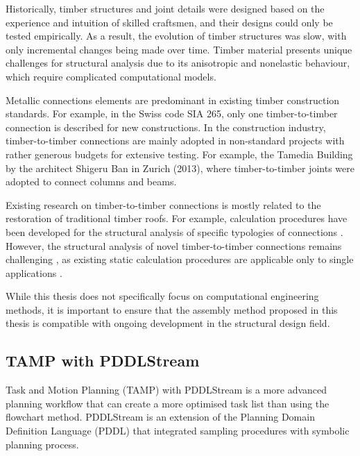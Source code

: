 Historically, timber structures and joint details were designed based on the experience and intuition of skilled craftsmen, and their designs could only be tested empirically. As a result, the evolution of timber structures was slow, with only incremental changes being made over time. Timber material presents unique challenges for structural analysis due to its anisotropic and nonelastic behaviour, which require complicated computational models. 

Metallic connections elements are predominant in existing timber construction standards. For example, in the Swiss code SIA 265, only one timber-to-timber connection is described for new constructions. In the construction industry, timber-to-timber connections are mainly adopted in non-standard projects with rather generous budgets for extensive testing. For example, the Tamedia Building by the architect Shigeru Ban in Zurich (2013), where timber-to-timber joints were adopted to connect columns and beams. \parencite{tanadiniAnalysisDesignTimbertotimber2021}

Existing research on timber-to-timber connections is mostly related to the restoration of traditional timber roofs. For example, calculation procedures have been developed for the structural analysis of specific typologies of connections \parencite{holzerstefanm.StaticAssessmentHistorical2015}. However, the structural analysis of novel timber-to-timber connections remains challenging \parencite{tanadiniAnalysisDesignTimbertotimber2021}, as existing static calculation procedures are applicable only to single applications \parencite{fangJoineryConnectionsTimber2018, nguyenDevelopmentSpringModel2018, rezaeiradMacroscopicModelSpatial2020}. 

While this thesis does not specifically focus on computational engineering methods, it is important to ensure that the assembly method proposed in this thesis is compatible with ongoing development in the structural design field.

\subsection{TAMP with PDDLStream}
\label{subsection:exploration-5-tamp-with-pddlstream}

Task and Motion Planning (TAMP) with PDDLStream \parencite{garrettPDDLStreamIntegratingSymbolic2020} is a more advanced planning workflow that can create a more optimised task list than using the flowchart method. PDDLStream is an extension of the Planning Domain Definition Language (PDDL) that integrated sampling procedures with symbolic planning process.

